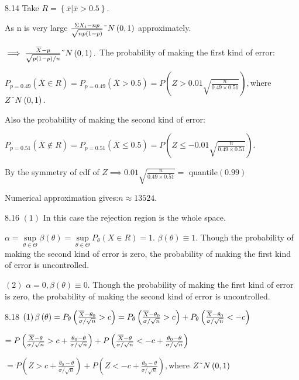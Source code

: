 \documentclass{article}
\begin{document}
8.14 Take $R=\left\{ \bar{x}|\bar{x}>0.5\right\} .$

As n is very large $\frac{\Sigma X_{i}-np}{\sqrt{np\left( 1-p\right) }}%
\symbol{126}N\left( 0,1\right) $ approximately.

$\implies \frac{\overline{X}-p}{\sqrt{p\left( 1-p\right) /n}}\symbol{126}%
N\left( 0,1\right) .$ The probability of making the first kind of error:

$P_{p=0.49}\left( \overline{X}\in R\right) =P_{p=0.49}\left( \overline{X}%
>0.5\right) =P\left( Z>0.01\sqrt{\frac{n}{0.49\times 0.51}}\right) ,$where $Z%
\symbol{126}N\left( 0,1\right) .$

Also the probability of making the second kind of error:

$P_{p=0.51}\left( \overline{X}\notin R\right) =P_{p=0.51}\left( \overline{X}%
\leq 0.5\right) =P\left( Z\leq -0.01\sqrt{\frac{n}{0.49\times 0.51}}\right) .
$

By the symmetry of cdf of $Z\implies 0.01\sqrt{\frac{n}{0.49\times 0.51}}=$%
quantile$\left( 0.99\right) $

Numerical approximation gives:$n\approx 13524.$

8.16 $\left( 1\right) $ In this case the rejection region is the whole space.

$\alpha =\underset{\theta \in \Theta }{\sup }\beta \left( \theta \right) =%
\underset{\theta \in \Theta }{\sup }P_{\theta }\left( X\in R\right) =1.$ $%
\beta \left( \theta \right) \equiv 1.$ Though the probability of making the
second kind of error is zero, the probability of making the first kind of
error is uncontrolled.

$\left( 2\right) $ $\alpha =0,\beta \left( \theta \right) \equiv 0.$ Though
the probability of making the first kind of error is zero, the probability
of making the second kind of error is uncontrolled.

8.18 $\left( 1\right) \beta \left( \theta \right) =P_{\theta }\left( \frac{%
\overline{X}-\theta _{0}}{\sigma /\sqrt{n}}>c\right) =P_{\theta }\left( 
\frac{\overline{X}-\theta _{0}}{\sigma /\sqrt{n}}>c\right) +P_{\theta
}\left( \frac{\overline{X}-\theta _{0}}{\sigma /\sqrt{n}}<-c\right) $

$=P\left( \frac{\overline{X}-\theta }{\sigma /\sqrt{n}}>c+\frac{\theta
_{0}-\theta }{\sigma /\sqrt{n}}\right) +P\left( \frac{\overline{X}-\theta }{%
\sigma /\sqrt{n}}<-c+\frac{\theta _{0}-\theta }{\sigma /\sqrt{n}}\right) $

$=P\left( Z>c+\frac{\theta _{0}-\theta }{\sigma /\sqrt{n}}\right) +P\left(
Z<-c+\frac{\theta _{0}-\theta }{\sigma /\sqrt{n}}\right) ,$where $Z\symbol{%
126}N\left( 0,1\right) $
\end{document}
